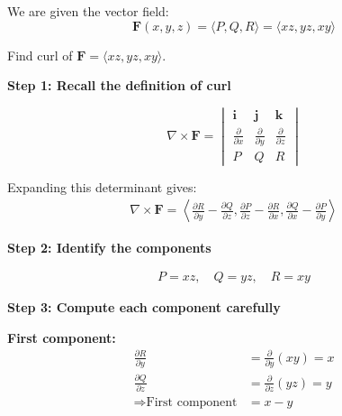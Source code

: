 \begin{examplebox}

    We are given the vector field:
    \begin{equation*}
        \mathbf{F}(x,y,z) = \langle P, Q, R \rangle = \langle xz, yz, xy \rangle
    \end{equation*}

    Find curl of $\mathbf{F}=\langle xz, yz, xy \rangle$.

    \textbf{Step 1: Recall the definition of curl}

    \begin{equation*}
        \nabla \times \mathbf{F} =
        \begin{vmatrix}
            \mathbf{i}                  & \mathbf{j}                  & \mathbf{k}                  \\
            \frac{\partial}{\partial x} & \frac{\partial}{\partial y} & \frac{\partial}{\partial z} \\
            P                           & Q                           & R
        \end{vmatrix}
    \end{equation*}

    Expanding this determinant gives:
    \begin{align*}
        \nabla \times \mathbf{F}
        = \left\langle
        \frac{\partial R}{\partial y} - \frac{\partial Q}{\partial z},
        \frac{\partial P}{\partial z} - \frac{\partial R}{\partial x},
        \frac{\partial Q}{\partial x} - \frac{\partial P}{\partial y}
        \right\rangle
    \end{align*}

    \textbf{Step 2: Identify the components}

    \begin{align*}
        P = xz, \quad Q = yz, \quad R = xy
    \end{align*}

    \textbf{Step 3: Compute each component carefully}

    \textbf{First component:}
    \begin{align*}
        \frac{\partial R}{\partial y}      & = \frac{\partial}{\partial y}(xy) = x \\
        \frac{\partial Q}{\partial z}      & = \frac{\partial}{\partial z}(yz) = y \\
        \Rightarrow \text{First component} & = x - y
    \end{align*}


\end{examplebox}
